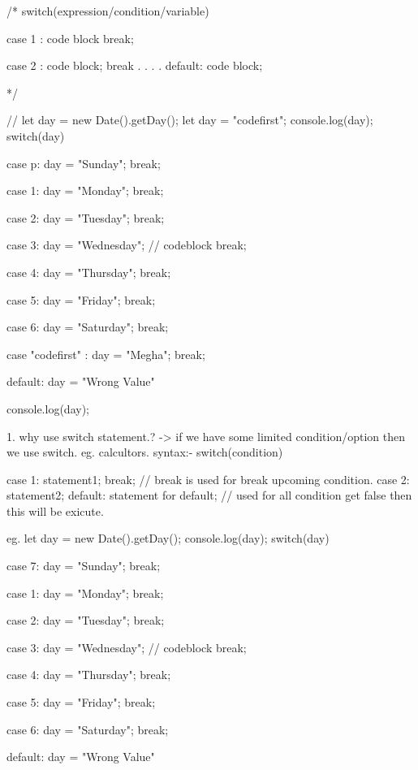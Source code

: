 /* switch(expression/condition/variable){
    case 1 :
        code block
    break;

    case 2 :
        code block;
    break
    .
    .
    .
    .
    default:
        code block;
}*/

// let day = new Date().getDay();
let day = "codefirst";
console.log(day);
switch(day){
 case p:
    day = "Sunday";
break;

case 1:
    day = "Monday";
break;

case 2:
    day = "Tuesday";
break;

case 3:
    day = "Wednesday";
    // codeblock
break;

case 4:
    day = "Thursday";
break;

case 5:
    day = "Friday";
break;

case 6:
    day = "Saturday";
break;

case "codefirst" :
    day = "Megha";
break;

default:
    day = "Wrong Value"

}
console.log(day);



1. why use switch statement.?
-> if we have some limited condition/option then we use switch.
eg. calcultors.
syntax:-
        switch(condition){
            case 1:{
                statement1;
            }
            break;   // break is used for break upcoming condition.
            case 2:{
                statement2;
            }
            default:{ 
                statement for default;
                            // used for all condition get false then this will be exicute.
            }

        }
eg.
 let day = new Date().getDay();
console.log(day);
switch(day){
 case 7:
    day = "Sunday";
break;

case 1:
    day = "Monday";
break;

case 2:
    day = "Tuesday";
break;

case 3:
    day = "Wednesday";
    // codeblock
break;

case 4:
    day = "Thursday";
break;

case 5:
    day = "Friday";
break;

case 6:
    day = "Saturday";
break;

default:
    day = "Wrong Value"

}
